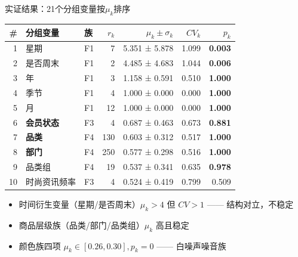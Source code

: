 \documentclass{beamer}
\begin{document}
\begin{frame}{实证结果：21个分组变量按$\mu_k$排序}
    \begin{table}
        \centering
        \footnotesize
        \begin{tabular}{rllrrrr}
            \toprule
            \# & 分组变量 & 族 & $r_k$ & $\mu_k \pm \sigma_k$ & $CV_k$ & $p_k$ \\
            \midrule
            1 & 星期 & F1 & 7 & 5.351 ± 5.878 & 1.099 & \textbf{0.003} \\
            2 & 是否周末 & F1 & 2 & 4.485 ± 4.683 & 1.044 & \textbf{0.006} \\
            3 & 年 & F1 & 3 & 1.158 ± 0.591 & 0.510 & \textbf{1.000} \\
            4 & 季节 & F1 & 4 & 1.000 ± 0.000 & 0.000 & \textbf{1.000} \\
            5 & 月 & F1 & 12 & 1.000 ± 0.000 & 0.000 & \textbf{1.000} \\
            6 & \textbf{会员状态} & F3 & 4 & 0.687 ± 0.463 & 0.673 & \textbf{0.881} \\
            7 & \textbf{品类} & F4 & 130 & 0.603 ± 0.312 & 0.517 & \textbf{1.000} \\
            8 & \textbf{部门} & F4 & 250 & 0.577 ± 0.298 & 0.516 & \textbf{1.000} \\
            9 & 品类组 & F4 & 19 & 0.537 ± 0.341 & 0.635 & \textbf{0.978} \\
            10 & 时尚资讯频率 & F3 & 4 & 0.524 ± 0.419 & 0.799 & 0.509 \\
            \bottomrule
        \end{tabular}
    \end{table}
    \vspace{-0.2cm}
    \begin{itemize}
        \item 时间衍生变量（星期/是否周末）$\mu_k > 4$ 但 $CV > 1$ —— 结构对立，不稳定
        \item 商品层级族（品类/部门/品类组）$\mu_k$ 高且稳定
        \item 颜色族四项 $\mu_k \in [0.26, 0.30], p_k = 0$ —— 白噪声噪音族
    \end{itemize}
\end{frame}
\end{document}
